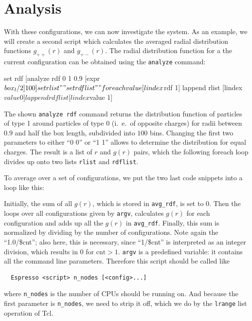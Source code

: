 \documentclass[
a4paper,                        %
11pt,                           %
twoside,                        %
footsepline,                    %
headsepline,                    %
headexclude,                    %
footexclude,                    %
pagesize,                       %
]{scrartcl}
\begin{document}
\section{Analysis}

With these configurations, we can now investigate the system. As an
example, we will create a second script which calculates the averaged
radial distribution functions $g_{++}(r)$ and $g_{+-}(r)$. The radial
distribution function for a the current configuration can be obtained
using the \verb|analyze| command:

\begin{tclcode}
  set rdf [analyze rdf 0 1 0.9 [expr $box_l/2] 100]
  set rlist ""
  set rdflist ""
  foreach value [lindex $rdf 1] {
    lappend rlist [lindex $value 0]
    lappend rdflist [lindex $value 1]
  }
\end{tclcode}

The shown \verb|analyze rdf| command returns the distribution function
of particles of type 1 around particles of type 0 (i.~e.\ of opposite
charges) for radii between $0.9$ and half the box length, subdivided
into $100$ bins.  Changing the first two parameters to either ``0 0''
or ``1 1'' allows to determine the distribution for equal charges. The
result is a list of $r$ and $g(r)$ pairs, which the following foreach
loop divides up onto two lists \verb|rlist| and \verb|rdflist|.

To average over a set of configurations, we put the two last code
snippets into a loop like this:


Initially, the sum of all $g(r)$, which is stored in \verb|avg_rdf|,
is set to 0.  Then the loops over all configurations given by
\verb|argv|, calculates $g(r)$ for each configuration and adds up all
the $g(r)$ in \verb|avg_rdf|.  Finally, this sum is normalized by
dividing by the number of configurations. Note again the
``1.0/\$cnt''; also here, this
is necessary, since ``1/\$cnt'' is interpreted as an integer division,
which results in 0 for $\text{cnt}>1$.  \verb|argv| is a predefined
variable: it contains all the command line parameters. Therefore this
script should be called like
\begin{verbatim}
  Espresso <script> n_nodes [<config>...]
\end{verbatim}
where \verb|n_nodes| is the number of CPUs \es should be running
on. And because the first parameter is \verb|n_nodes|, we need to
strip it off, which we do by the \verb|lrange| list operation of Tcl.
\end{document}
